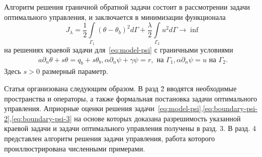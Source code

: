 Алгоритм решения граничной обратной задачи состоит в рассмотрении задачи оптимального управления,
и заключается в минимизации функционала
\begin{equation}
    \label{eq:quality}
    J_\lambda = \frac{1}{2}\int\limits_{\Gamma_1} (\theta - \theta_b)^2 d\Gamma
    + \frac{\lambda}{2} \int\limits_{\Gamma_2} u^2 d\Gamma \rightarrow \inf
\end{equation}
на решениях краевой задачи для~\eqref{eq:model-psi} с граничными условиями
\begin{equation}
    \label{eq:boundary-psi-3}
     \begin{aligned}
        a \partial_n \theta + s \theta = q_b + s\theta_b, \alpha \partial_n \psi + \gamma \psi = r, \text{ на } \Gamma_1,
        \alpha \partial_n \psi = u \text{ на } \Gamma_2.
    \end{aligned}
\end{equation}
Здесь $s > 0$ размерный параметр.


Статья организована следующим образом.
В разд \. 2 вводятся необходимые пространства и операторы,
а также формальная постановка задачи оптимального управления.
Априорные оценки решения задачи~\eqref{eq:model-psi},\eqref{eq:boundary-psi-2},\eqref{eq:boundary-psi-3}
на основе которых доказана разрешимость
указанной краевой задачи и задачи оптимального управления получены в разд. 3.
В разд. 4 представлен алгоритм решения задачи управления, работа которого
проиллюстрирована численными примерами.

